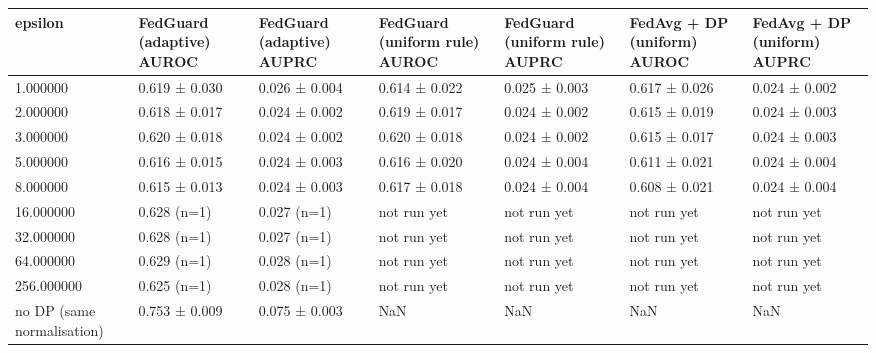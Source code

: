 \begin{tabular}{lllllll}
\toprule
epsilon & FedGuard (adaptive) AUROC & FedGuard (adaptive) AUPRC & FedGuard (uniform rule) AUROC & FedGuard (uniform rule) AUPRC & FedAvg + DP (uniform) AUROC & FedAvg + DP (uniform) AUPRC \\
\midrule
1.000000 & 0.619 ± 0.030 & 0.026 ± 0.004 & 0.614 ± 0.022 & 0.025 ± 0.003 & 0.617 ± 0.026 & 0.024 ± 0.002 \\
2.000000 & 0.618 ± 0.017 & 0.024 ± 0.002 & 0.619 ± 0.017 & 0.024 ± 0.002 & 0.615 ± 0.019 & 0.024 ± 0.003 \\
3.000000 & 0.620 ± 0.018 & 0.024 ± 0.002 & 0.620 ± 0.018 & 0.024 ± 0.002 & 0.615 ± 0.017 & 0.024 ± 0.003 \\
5.000000 & 0.616 ± 0.015 & 0.024 ± 0.003 & 0.616 ± 0.020 & 0.024 ± 0.004 & 0.611 ± 0.021 & 0.024 ± 0.004 \\
8.000000 & 0.615 ± 0.013 & 0.024 ± 0.003 & 0.617 ± 0.018 & 0.024 ± 0.004 & 0.608 ± 0.021 & 0.024 ± 0.004 \\
16.000000 & 0.628 (n=1) & 0.027 (n=1) & not run yet & not run yet & not run yet & not run yet \\
32.000000 & 0.628 (n=1) & 0.027 (n=1) & not run yet & not run yet & not run yet & not run yet \\
64.000000 & 0.629 (n=1) & 0.028 (n=1) & not run yet & not run yet & not run yet & not run yet \\
256.000000 & 0.625 (n=1) & 0.028 (n=1) & not run yet & not run yet & not run yet & not run yet \\
no DP (same normalisation) & 0.753 ± 0.009 & 0.075 ± 0.003 & NaN & NaN & NaN & NaN \\
\bottomrule
\end{tabular}
